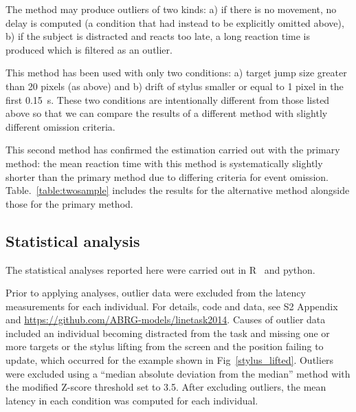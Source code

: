 \documentclass[10pt,letterpaper]{article}
\newcommand{\filename}[1]{\textsf{\textbf{#1}}}
\newcommand{\codeparam}[1]{\textsf{\textbf{#1}}}
\begin{document}
The method may produce outliers of two kinds: a) if there is no
movement, no delay is computed (a condition that had instead to be
explicitly omitted above), b) if the subject is distracted and reacts
too late, a long reaction time is produced which is filtered as an
outlier.

This method has been used with only two conditions: a) target
jump size greater than 20 pixels (as above) and b) drift of stylus
smaller or equal to 1 pixel in the first 0.15~s. These two conditions
are intentionally different from those listed above so that we can
compare the results of a different method with slightly different
omission criteria.

This second method has confirmed the estimation carried out with the
primary method: the mean reaction time with this method is
systematically slightly shorter than the primary method due to
differing criteria for event omission. Table.~\ref{table:twosample}
includes the results for the alternative method alongside those for
the primary method.

\subsection*{Statistical analysis}

%
The statistical analyses reported here were carried out in
R~\cite{r_core_team_r:_2013} and python.

Prior to applying analyses, outlier data were excluded from the
latency measurements for each individual. For details, code and data,
see S2 Appendix and \url{https://github.com/ABRG-models/linetask2014}.
%
%
Causes of outlier data included an individual becoming distracted from
the task and missing one or more targets or the stylus lifting from
the screen and the position failing to update, which occurred for the
example shown in Fig~\ref{stylus_lifted}. Outliers were excluded
using a ``median absolute deviation from the median'' method
\cite{boris_iglewicz_how_1993} with the modified Z-score threshold set
to 3.5. After excluding outliers, the mean latency in each condition
was computed for each individual.
\end{document}
